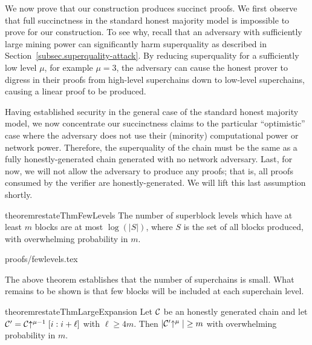 \label{sec.succinctness}

We now prove that our construction produces succinct proofs.
%
We first observe that full succinctness in the standard honest majority model is
impossible to prove for our construction. To see why, recall that an adversary
with sufficiently large mining power can significantly harm superquality as
described in %
Section~\ref{subsec.superquality-attack}. By reducing
 superquality for a sufficiently low level $\mu$, for example $\mu = 3$, the
adversary can cause the honest prover to digress in their proofs from high-level
superchains down to low-level superchains, causing a linear proof to be
produced.

Having established security in the general case of the standard honest majority
model, we now concentrate our succinctness claims to the particular
``optimistic'' case where the adversary does not use their (minority)
computational power or network power. Therefore, the superquality of the chain
must be the same as a fully honestly-generated chain generated with no network
adversary. Last, for now, we will not allow the adversary to produce any proofs;
that is, all proofs consumed by the verifier are honestly-generated. We will
lift this last assumption shortly.

\begin{restatable}{theorem}{restateThmFewLevels}
    \label{thm.few-levels}
    The number of superblock levels which have at least $m$ blocks are at most
    $\log(|S|)$, where $S$ is the set of all blocks produced, with overwhelming
    probability in $m$.
\end{restatable}

\ifonecolumn
{proofs/fewlevels.tex}
\fi

The above theorem establishes that the number of superchains is small. What
remains to be shown is that few blocks will be included at each superchain
level.

\begin{restatable}{theorem}{restateThmLargeExpansion}
    \label{thm.large-expansion}
    Let $\mathcal{C}$ be an honestly generated chain and let
    $\mathcal{C}' = \mathcal{C}\negthickspace\uparrow^{\mu - 1}[i:i + \ell]$ with $\ell \geq 4m$.
    Then $|\mathcal{C}'\negthickspace\uparrow^\mu| \geq m$
    with overwhelming probability in $m$.
\end{restatable}

